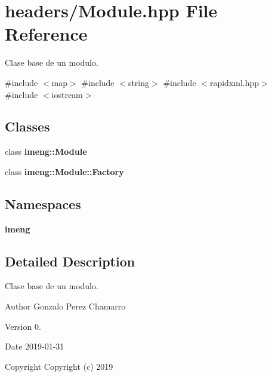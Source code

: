 \section{headers/\+Module.hpp File Reference}
\label{_module_8hpp}


Clase base de un modulo.  


{\ttfamily \#include $<$map$>$}\newline
{\ttfamily \#include $<$string$>$}\newline
{\ttfamily \#include $<$rapidxml.\+hpp$>$}\newline
{\ttfamily \#include $<$iostream$>$}\newline
\subsection*{Classes}
\begin{DoxyCompactItemize}
\item 
class \textbf{ imeng\+::\+Module}
\item 
class \textbf{ imeng\+::\+Module\+::\+Factory}
\end{DoxyCompactItemize}
\subsection*{Namespaces}
\begin{DoxyCompactItemize}
\item 
 \textbf{ imeng}
\end{DoxyCompactItemize}


\subsection{Detailed Description}
Clase base de un modulo. 

\begin{DoxyAuthor}{Author}
Gonzalo Perez Chamarro 
\end{DoxyAuthor}
\begin{DoxyVersion}{Version}
0. 
\end{DoxyVersion}
\begin{DoxyDate}{Date}
2019-\/01-\/31
\end{DoxyDate}
\begin{DoxyCopyright}{Copyright}
Copyright (c) 2019 
\end{DoxyCopyright}
